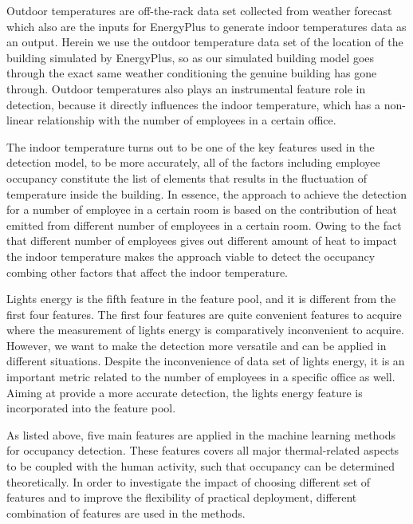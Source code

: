 Outdoor temperatures are off-the-rack data set collected from weather
forecast which also are the inputs for EnergyPlus to generate indoor
temperatures data as an output. Herein we use the outdoor
temperature data set of the location of the building simulated by EnergyPlus, so as
our simulated building model goes through the exact same weather
conditioning the genuine building has gone through. Outdoor
temperatures also plays an instrumental feature role in detection,
because it directly influences the indoor temperature, which has a
non-linear relationship with the number of employees in a certain
office.

The indoor temperature turns out to be one of the key features used in
the detection model, to be more accurately, all of the factors
including employee occupancy constitute the list of elements that
results in the fluctuation of temperature inside the building. In
essence, the approach to achieve the detection for a number of
employee in a certain room is based on the contribution of heat
emitted from different number of employees in a certain room. Owing to
the fact that different number of employees gives out different amount
of heat to impact the indoor temperature makes the approach viable to
detect the occupancy combing other factors that affect the indoor
temperature.

Lights energy is the fifth feature in the feature pool, and it is
different from the first four features. The first four features are quite
convenient features to acquire where the measurement of lights energy
is comparatively inconvenient to acquire. However, we want to make the
detection more versatile and can be applied in different situations.
Despite the inconvenience of data set of lights energy, it is an
important metric related to the number of employees in a specific office
as well. Aiming at provide a more accurate detection, the lights
energy feature is incorporated into the feature pool.

\textcolor{feb18rev}{As listed above, five main features are applied in the machine learning methods for occupancy detection. 
These features covers all major thermal-related aspects to be coupled with the human activity, such that
occupancy can be determined theoretically. In order to investigate the impact
of choosing different set of features and to improve the flexibility of practical
deployment, different combination of features are used in the methods.}

